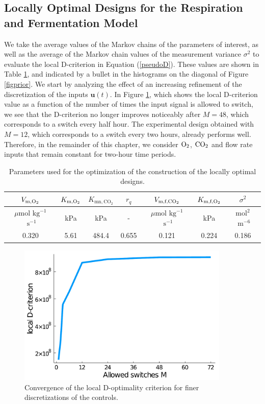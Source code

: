 \subsection{Locally Optimal Designs for the Respiration and Fermentation Model}
We take the average values of the Markov chains of the parameters of interest, as well as the average of the Markov chain values of the {\color{red}measurement variance} $\sigma^2$ to evaluate the local D-criterion in Equation (\ref{pseudoD}). These values are shown in Table \ref{tableLocal}, and indicated by a bullet in the histograms on the diagonal of Figure \ref{figprior}. We start by analyzing the effect of an increasing refinement of the discretization of the inputs $\bm u(t)$. In Figure \ref{figconvergence}, which shows the local D-criterion value as a function of the number of times the input signal is allowed to switch, we see that the D-criterion no longer improves noticeably after $M = 48$, which corresponds to a switch every half hour. The experimental design obtained with $M = 12$, which corresponds to a switch every two hours, already performs well. Therefore, in the remainder of this chapter, we consider $\text{O}_2$, $\text{CO}_2$ and flow rate inputs that remain constant for two-hour time periods.
\begin{table}[h!]
	\centering
	\setlength{\tabcolsep}{4pt} 
	\small
	\begin{tabular}{|c c c c c c c|}

		\hline
		$V_{\text{m},\text{O}_2}$ & $K_{\text{m},\text{O}_2}$ &  $K_{\text{mn},\text{CO}_2}$ & $r_q$ & $V_{\text{m,f,}\text{CO}_2}$ & $K_{\text{m,f},\text{O}_2}$ & $\sigma^2$\\ [0.5ex] 
		\hline
		$\mu$mol$\text{ kg}^{-1}$ $\text{ s}^{-1}$ & kPa & kPa & - & $\mu$mol$\text{ kg}^{-1}$ $\text{ s}^{-1}$& kPa & $\text{mol}^2$$\text{ m}^{-6}$	\\ [0.5ex] 
		\hline
		0.320 & 5.61 & 484.4 & 0.655 & 0.121 & 0.224 & 0.186\\ [1ex] 
		\hline
	\end{tabular}
	\caption{Parameters used for the optimization of the construction of the locally optimal designs.}
	\label{tableLocal} 
\end{table}
\begin{figure}[h]
	\centering
	\includegraphics[width=0.9\textwidth]{figure/paper 2/convergence.pdf}
	\caption{Convergence of the local D-optimality criterion for finer discretizations of the controls.}
	\label{figconvergence}
\end{figure}
